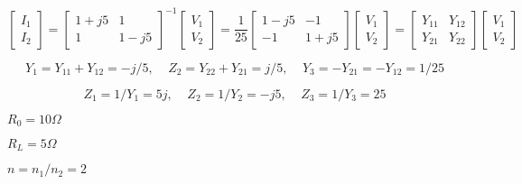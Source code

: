 {\newpage\clearpage
{}%
\begin{displaymath}	\left[ \begin{array}{l} I_1 \\I_2\end{array} \right]=
	\left[ \begin{array}{cc} 1+j5 & 1 \\1 & 1-j5 \end{array} \right]^{-1}
	\left[ \begin{array}{l} V_1 \\V_2\end{array} \right]
=\frac{1}{25}
	\left[ \begin{array}{cc} 1-j5 & -1 \\-1 & 1+j5 \end{array} \right]
	\left[ \begin{array}{l} V_1 \\V_2\end{array} \right]
=	\left[ \begin{array}{cc} Y_{11} & Y_{12} \\Y_{21} & Y_{22} \end{array} \right]
	\left[ \begin{array}{l} V_1 \\V_2\end{array} \right]
\end{displaymath}%
\lthtmldisplayZ
\lthtmlcheckvsize\clearpage}

{\newpage\clearpage
{}%
\begin{displaymath} Y_1=Y_{11}+Y_{12}=-j/5,\;\;\;\;Z_2=Y_{22}+Y_{21}=j/5,\;\;\;\;
	Y_3=-Y_{21}=-Y_{12}=1/25 \end{displaymath}%
\lthtmldisplayZ
\lthtmlcheckvsize\clearpage}

{\newpage\clearpage
{}%
\begin{displaymath} Z_1=1/Y_1=5j,\;\;\;\;Z_2=1/Y_2=-j5,\;\;\;\;Z_3=1/Y_3=25	\end{displaymath}%
\lthtmldisplayZ
\lthtmlcheckvsize\clearpage}

{\newpage\clearpage
{}%
$R_0=10\Omega$%
\lthtmlinlinemathZ
\lthtmlcheckvsize\clearpage}

{\newpage\clearpage
{}%
$R_L=5\Omega$%
\lthtmlinlinemathZ
\lthtmlcheckvsize\clearpage}

{\newpage\clearpage
{}%
$n=n_1/n_2=2$%
\lthtmlinlinemathZ
\lthtmlcheckvsize\clearpage}

